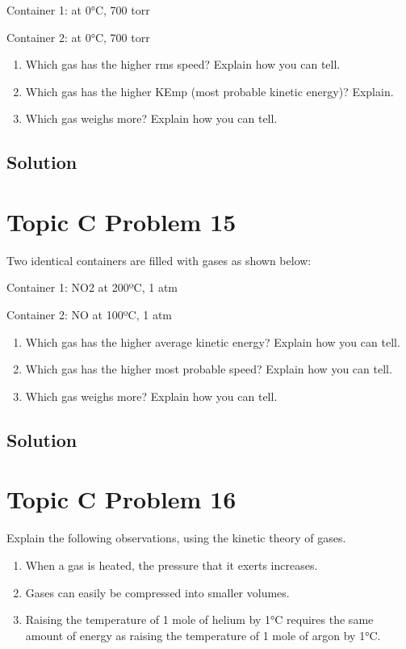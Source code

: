 \documentclass[10pt]{article}
\begin{document}
        Container 1:  at 0\unit{\celsius}, 700 torr
        
        Container 2:  at 0\unit{\celsius}, 700 torr
        \begin{enumerate} [label=\alph*)]
            \item Which gas has the higher rms speed? Explain how you can tell.
            \item Which gas has the higher KEmp (most probable kinetic energy)? Explain.
            \item Which gas weighs more? Explain how you can tell.
        \end{enumerate}

        \subsection{Solution}

    \pagebreak
    \section{Topic C Problem 15}
        Two identical containers are filled with gases as shown below:
        
        Container 1: NO2 at 200ºC, 1 atm 
        
        Container 2: NO at 100ºC, 1 atm
        
        \begin{enumerate} [label=\alph*)]
            \item Which gas has the higher average kinetic energy? Explain how you can tell.
            \item Which gas has the higher most probable speed? Explain how you can tell.
            \item Which gas weighs more? Explain how you can tell.
        \end{enumerate}

        \subsection{Solution}

    \pagebreak
    \section{Topic C Problem 16}
        Explain the following observations, using the kinetic theory of gases.
        \begin{enumerate} [label=\alph*)]
            \item When a gas is heated, the pressure that it exerts increases.
            \item Gases can easily be compressed into smaller volumes.
            \item Raising the temperature of 1 mole of helium by 1\unit{\celsius} requires the same amount of energy as raising the temperature of 1 mole of argon by 1\unit{\celsius}.
        \end{enumerate}
\end{document}
